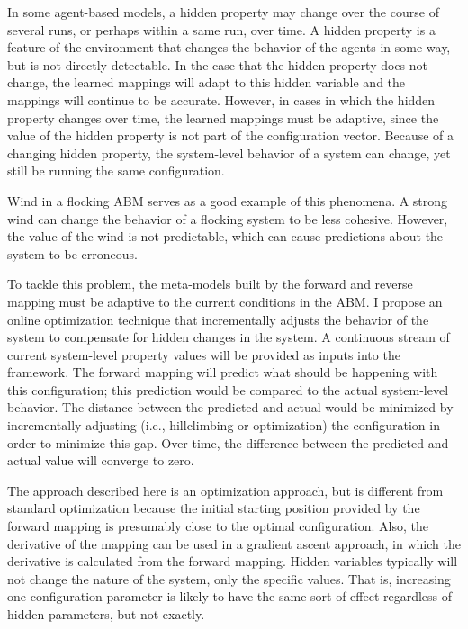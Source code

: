 In some agent-based models, a hidden property may change over the course of several runs, or perhaps within a same run, over time.
A hidden property is a feature of the environment that changes the behavior of the agents in some way, but is not directly detectable.
In the case that the hidden property does not change, the learned mappings will adapt to this hidden variable and the mappings will continue to be accurate.
However, in cases in which the hidden property changes over time, the learned mappings must be adaptive, since the value of the hidden property is not part of the configuration vector.
Because of a changing hidden property, the system-level behavior of a system can change, yet still be running the same configuration.

Wind in a flocking ABM serves as a good example of this phenomena.
A strong wind can change the behavior of a flocking system to be less cohesive.
However, the value of the wind is not predictable, which can cause predictions about the system to be erroneous.

To tackle this problem, the meta-models built by the forward and reverse mapping must be adaptive to the current conditions in the ABM.
I propose an online optimization technique that incrementally adjusts the behavior of the system to compensate for hidden changes in the system.
A continuous stream of current system-level property values will be provided as inputs into the framework.
The forward mapping will predict what should be happening with this configuration; this prediction would be compared to the actual system-level behavior.
The distance between the predicted and actual would be minimized by incrementally adjusting (i.e., hillclimbing or optimization) the configuration in order to minimize this gap.
Over time, the difference between the predicted and actual value will converge to zero.

The approach described here is an optimization approach, but is different from standard optimization because the initial starting position provided by the forward mapping is presumably close to the optimal configuration.
Also, the derivative of the mapping can be used in a gradient ascent approach, in which the derivative is calculated from the forward mapping.
Hidden variables typically will not change the nature of the system, only the specific values.
That is, increasing one configuration parameter is likely to have the same sort of effect regardless of hidden parameters, but not exactly.



